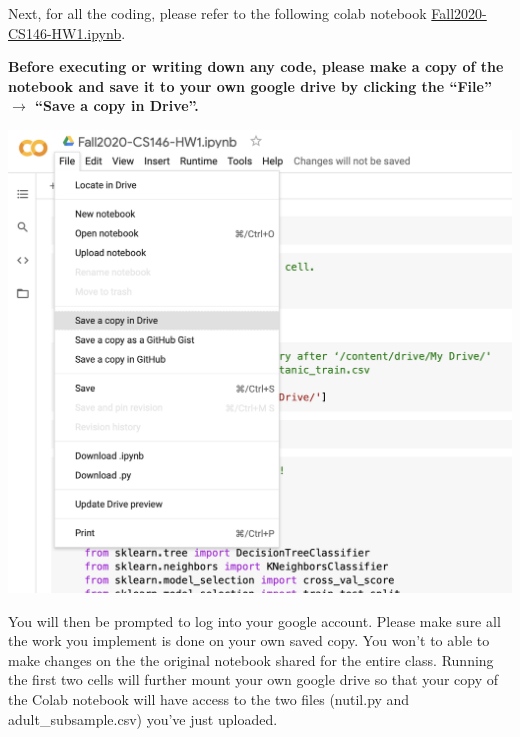 \ifsoln
\else
\clearpage
\fi

Next, for all the coding, please refer to the following colab notebook  
\href{https://colab.research.google.com/drive/1_O5QwkZ33fnYbW3zwSnKjeVYkeoEtIeD?usp=sharing}{Fall2020-CS146-HW1.ipynb}. 

\textbf{Before executing or writing down any code, please make a copy of the notebook and save it to your own google drive by clicking the “File” $\rightarrow$ “Save a copy in Drive”.} 

\begin{minipage}[c]{.5\textwidth}
\centering
\includegraphics[scale=0.5]{save-colab-to-drive.png}
\end{minipage}%
\begin{minipage}[c]{.45\textwidth}
\end{minipage}%


You will then be prompted to log into your google account. Please make sure all the work you implement is done on your own saved copy. You won’t to able to make changes on the the original notebook shared for the entire class. Running the first two cells will further mount your own google drive so that your copy of the Colab notebook will have access to the two files (nutil.py and adult\_subsample.csv) you’ve just uploaded.

